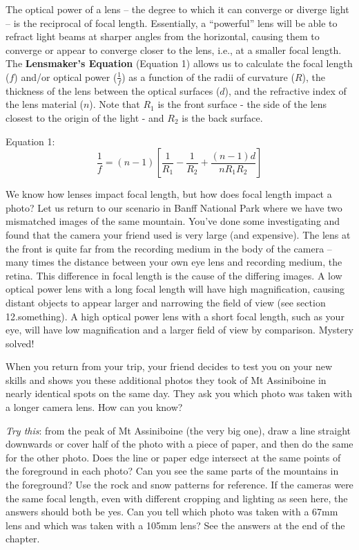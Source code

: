 \documentclass[
]{book}
\begin{document}
The optical power of a lens -- the degree to which it can converge or diverge light -- is the reciprocal of focal length. Essentially, a ``powerful'' lens will be able to refract light beams at sharper angles from the horizontal, causing them to converge or appear to converge closer to the lens, i.e., at a smaller focal length. The \textbf{Lensmaker's Equation} (Equation 1) allows us to calculate the focal length (\(f\)) and/or optical power (\(\frac{1}{f}\)) as a function of the radii of curvature (\(R\)), the thickness of the lens between the optical surfaces (\(d\)), and the refractive index of the lens material (\(n\)). Note that \(R_1\) is the front surface - the side of the lens closest to the origin of the light - and \(R_2\) is the back surface.

Equation 1: \[\frac{1}{f} = (n-1)[\frac{1}{R_1} - \frac{1}{R_2} + \frac{(n-1)d}{nR_1R_2}]\]

We know how lenses impact focal length, but how does focal length impact a photo? Let us return to our scenario in Banff National Park where we have two mismatched images of the same mountain. You've done some investigating and found that the camera your friend used is very large (and expensive). The lens at the front is quite far from the recording medium in the body of the camera -- many times the distance between your own eye lens and recording medium, the retina. This difference in focal length is the cause of the differing images. A low optical power lens with a long focal length will have high magnification, causing distant objects to appear larger and narrowing the field of view (see section 12.something). A high optical power lens with a short focal length, such as your eye, will have low magnification and a larger field of view by comparison. Mystery solved!

When you return from your trip, your friend decides to test you on your new skills and shows you these additional photos they took of Mt Assiniboine in nearly identical spots on the same day. They ask you which photo was taken with a longer camera lens. How can you know?

\emph{Try this}: from the peak of Mt Assiniboine (the very big one), draw a line straight downwards or cover half of the photo with a piece of paper, and then do the same for the other photo. Does the line or paper edge intersect at the same points of the foreground in each photo? Can you see the same parts of the mountains in the foreground? Use the rock and snow patterns for reference. If the cameras were the same focal length, even with different cropping and lighting as seen here, the answers should both be yes. Can you tell which photo was taken with a 67mm lens and which was taken with a 105mm lens? See the answers at the end of the chapter.
\end{document}
